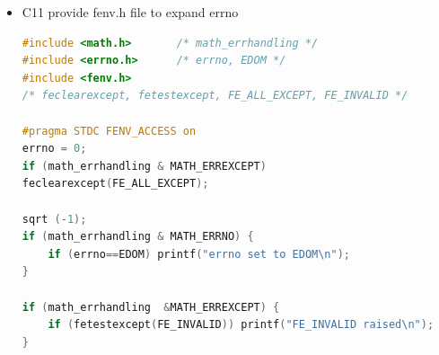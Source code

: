 \documentclass[a4paper,11pt,twoside]{book}
\begin{document}
\begin{itemize}
\item C11 provide fenv.h file to expand errno
\begin{lstlisting}[frame=single, language=c++]
#include <math.h>       /* math_errhandling */
#include <errno.h>      /* errno, EDOM */
#include <fenv.h>
/* feclearexcept, fetestexcept, FE_ALL_EXCEPT, FE_INVALID */
	
#pragma STDC FENV_ACCESS on
errno = 0;
if (math_errhandling & MATH_ERREXCEPT)
feclearexcept(FE_ALL_EXCEPT);
	
sqrt (-1);
if (math_errhandling & MATH_ERRNO) {
	if (errno==EDOM) printf("errno set to EDOM\n");
}
	
if (math_errhandling  &MATH_ERREXCEPT) {
	if (fetestexcept(FE_INVALID)) printf("FE_INVALID raised\n");
}
\end{lstlisting}
	
\end{itemize}
\end{document}
